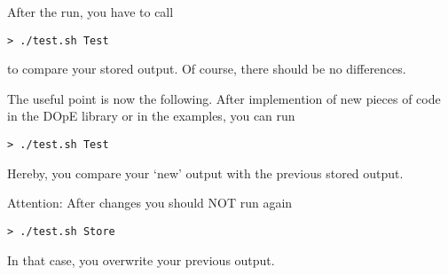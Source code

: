 \documentclass[a4paper,cleardoubleempty]{scrreprt}
\begin{document}
After the run, you have to call 
\begin{verbatim}
> ./test.sh Test
\end{verbatim}
to compare your stored output. Of course, there should be no differences.

The useful point is now the following. After implemention of 
new pieces of code in the DOpE library or in the examples, you can
run 
\begin{verbatim}
> ./test.sh Test
\end{verbatim}
Hereby, you compare your `new' output with the previous stored output.

Attention: After changes you should NOT run again
\begin{verbatim}
> ./test.sh Store
\end{verbatim}
In that case, you overwrite your previous output.
\cleardoublepage





\printindex

\end{document}
